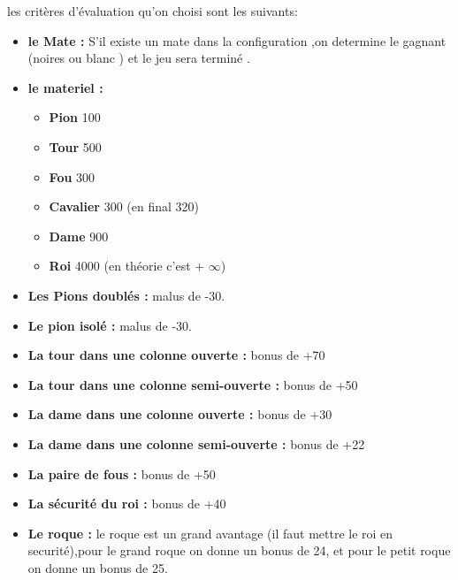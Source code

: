 \documentclass[12pt]{report}
\begin{document}
 les critères d'évaluation qu'on choisi sont les suivants:
 \newpage
 \begin{itemize}
 	\item \textbf{le Mate :}
 	\newline S'il existe un mate dans la configuration ,on determine le gagnant (noires ou blanc ) et le jeu sera terminé .
 	\item \textbf{le materiel :} 
 	\newline
 	\begin{itemize}
 		\item \textbf{ Pion }	 100 \\
 \item \textbf{	Tour }    500 \\
 \item \textbf{	Fou   }   300 \\
 \item \textbf{	Cavalier} 300 (en final 320) \\
 \item \textbf{	Dame	 }900 \\
 \item \textbf{	Roi		 }4000 (en théorie c'est + $\infty$) \\
 \end{itemize} 
	\item \textbf{Les Pions doublés :} malus de -30.\\
	\item \textbf{Le pion isolé :}     malus de -30.\\
	\item \textbf{La tour dans une colonne ouverte :} bonus de +70\\
	\item \textbf{La tour dans une colonne semi-ouverte :} bonus de +50\\	
	\item \textbf{La dame dans une colonne ouverte :} bonus de +30\\
	\item \textbf{La dame dans une colonne semi-ouverte :} bonus de +22\\	
	\item \textbf{La paire de fous :} bonus de +50\\	
	\item \textbf{La sécurité du roi :} bonus de +40\\	
	\item \textbf{Le roque :} le roque est un grand avantage (il faut mettre le roi en securité),pour le grand roque on donne un bonus de 24, et pour le petit roque on donne un bonus de 25. \\	

\end{itemize}
\end{document}
